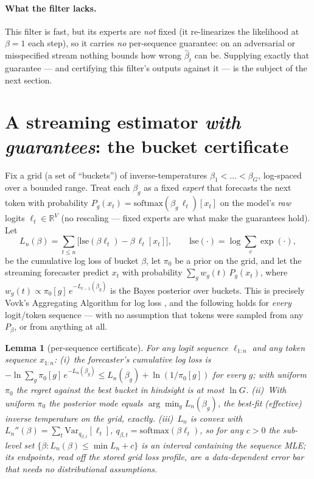 \documentclass[11pt]{article}
\newtheorem{lemma}{Lemma}
\begin{document}
\paragraph{What the filter lacks.}
This filter is fast, but its experts are \emph{not} fixed (it re-linearizes the
likelihood at $\beta{=}1$ each step), so it carries \emph{no} per-sequence
guarantee: on an adversarial or misspecified stream nothing bounds how wrong
$\hat\beta_t$ can be. Supplying exactly that guarantee --- and certifying this
filter's outputs against it --- is the subject of the next section.

\section{A streaming estimator \emph{with guarantees}: the bucket certificate}\label{sec:cert}
Fix a grid (a set of ``buckets'') of inverse-temperatures
$\beta_1 < \dots < \beta_G$, log-spaced over a bounded range. Treat each
$\beta_g$ as a fixed \emph{expert} that forecasts the next token with probability
$P_g(x_t) = \mathrm{softmax}(\beta_g\,\ell_t)[x_t]$ on the model's \emph{raw}
logits $\ell_t \in \mathbb{R}^V$ (no rescaling --- fixed experts are what make
the guarantees hold). Let
\[
  L_n(\beta) = \sum_{t\le n} \big[\mathrm{lse}(\beta\ell_t) - \beta\,\ell_t[x_t]\big],
  \qquad \mathrm{lse}(\cdot) = \log\textstyle\sum_v \exp(\cdot),
\]
be the cumulative log loss of bucket $\beta$, let $\pi_0$ be a prior on the grid,
and let the streaming forecaster predict $x_t$ with probability
$\sum_g w_g(t)\,P_g(x_t)$, where $w_g(t) \propto \pi_0[g]\,e^{-L_{t-1}(\beta_g)}$
is the Bayes posterior over buckets. This is precisely Vovk's Aggregating
Algorithm for log loss \citep{vovk1998game,cesabianchi2006prediction}, and the
following holds for \emph{every} logit/token sequence --- with no assumption that
tokens were sampled from any $P_\beta$, or from anything at all.

\begin{lemma}[per-sequence certificate]\label{lem:certificate}
For any logit sequence $\ell_{1:n}$ and any token sequence $x_{1:n}$:
(i)~the forecaster's cumulative log loss is
$-\ln \sum_g \pi_0[g]\, e^{-L_n(\beta_g)} \le L_n(\beta_g) + \ln(1/\pi_0[g])$
for every $g$; with uniform $\pi_0$ the regret against the best bucket in
hindsight is at most $\ln G$.
(ii)~With uniform $\pi_0$ the posterior mode equals $\arg\min_g L_n(\beta_g)$,
the best-fit (\emph{effective}) inverse temperature on the grid, exactly.
(iii)~$L_n$ is convex with $L_n''(\beta) = \sum_t \mathrm{Var}_{q_{\beta,t}}[\ell_t]$,
$q_{\beta,t} = \mathrm{softmax}(\beta\ell_t)$, so for any $c>0$ the sub-level set
$\{\beta : L_n(\beta) \le \min L_n + c\}$ is an interval containing the sequence
MLE; its endpoints, read off the stored grid loss profile, are a data-dependent
error bar that needs no distributional assumptions.
\end{lemma}
\end{document}
